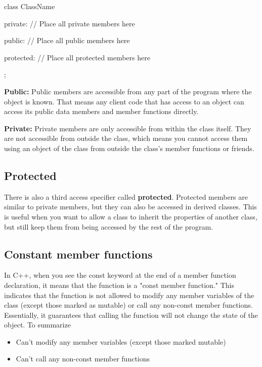\documentclass{report}
\begin{document}
    \begin{cppcode}
class ClassName {
    private:
        // Place all private members here

    public: 
        // Place all public members here

    protected:
        // Place all protected members here
};
    \end{cppcode}
    
    \bigbreak \noindent 
    \textbf{Public:}
    \bigbreak \noindent 
    Public members are accessible from any part of the program where the object is known. That means any client code that has access to an object can access its public data members and member functions directly.

    \bigbreak \noindent 
    \textbf{Private:}
    \bigbreak \noindent 
    Private members are only accessible from within the class itself. They are not accessible from outside the class, which means you cannot access them using an object of the class from outside the class's member functions or friends. 
    \bigbreak \noindent 
    
    \bigbreak \noindent 
    \subsection{Protected}
    \bigbreak \noindent 
    There is also a third access specifier called \textbf{protected}. Protected members are similar to private members, but they can also be accessed in derived classes. This is useful when you want to allow a class to inherit the properties of another class, but still keep them from being accessed by the rest of the program.

    \bigbreak \noindent 
    \subsection{Constant member functions} 
    \bigbreak \noindent 
    In C++, when you see the const keyword at the end of a member function declaration, it means that the function is a "const member function." This indicates that the function is not allowed to modify any member variables of the class (except those marked as mutable) or call any non-const member functions. Essentially, it guarantees that calling the function will not change the state of the object. To summarize
    \begin{itemize}
        \item Can't modify any member variables (except those marked mutable)
        \item Can't call any non-const member functions
    \end{itemize}
\end{document}
